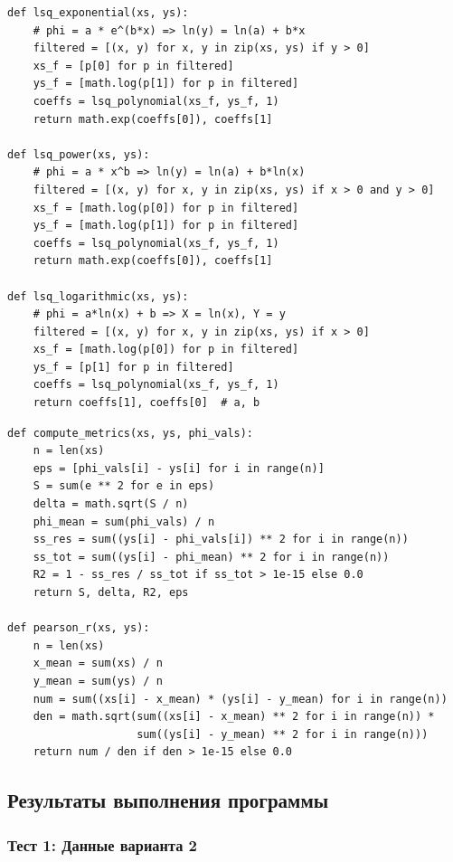 \documentclass[a4paper,12pt]{article}
\begin{document}
\begin{lstlisting}[style=intellij, caption={Линеаризация нелинейных функций}]
def lsq_exponential(xs, ys):
    # phi = a * e^(b*x) => ln(y) = ln(a) + b*x
    filtered = [(x, y) for x, y in zip(xs, ys) if y > 0]
    xs_f = [p[0] for p in filtered]
    ys_f = [math.log(p[1]) for p in filtered]
    coeffs = lsq_polynomial(xs_f, ys_f, 1)
    return math.exp(coeffs[0]), coeffs[1]

def lsq_power(xs, ys):
    # phi = a * x^b => ln(y) = ln(a) + b*ln(x)
    filtered = [(x, y) for x, y in zip(xs, ys) if x > 0 and y > 0]
    xs_f = [math.log(p[0]) for p in filtered]
    ys_f = [math.log(p[1]) for p in filtered]
    coeffs = lsq_polynomial(xs_f, ys_f, 1)
    return math.exp(coeffs[0]), coeffs[1]

def lsq_logarithmic(xs, ys):
    # phi = a*ln(x) + b => X = ln(x), Y = y
    filtered = [(x, y) for x, y in zip(xs, ys) if x > 0]
    xs_f = [math.log(p[0]) for p in filtered]
    ys_f = [p[1] for p in filtered]
    coeffs = lsq_polynomial(xs_f, ys_f, 1)
    return coeffs[1], coeffs[0]  # a, b
\end{lstlisting}

\begin{lstlisting}[style=intellij, caption={Метрики качества аппроксимации}]
def compute_metrics(xs, ys, phi_vals):
    n = len(xs)
    eps = [phi_vals[i] - ys[i] for i in range(n)]
    S = sum(e ** 2 for e in eps)
    delta = math.sqrt(S / n)
    phi_mean = sum(phi_vals) / n
    ss_res = sum((ys[i] - phi_vals[i]) ** 2 for i in range(n))
    ss_tot = sum((ys[i] - phi_mean) ** 2 for i in range(n))
    R2 = 1 - ss_res / ss_tot if ss_tot > 1e-15 else 0.0
    return S, delta, R2, eps

def pearson_r(xs, ys):
    n = len(xs)
    x_mean = sum(xs) / n
    y_mean = sum(ys) / n
    num = sum((xs[i] - x_mean) * (ys[i] - y_mean) for i in range(n))
    den = math.sqrt(sum((xs[i] - x_mean) ** 2 for i in range(n)) *
                    sum((ys[i] - y_mean) ** 2 for i in range(n)))
    return num / den if den > 1e-15 else 0.0
\end{lstlisting}

\subsection{Результаты выполнения программы}

\subsubsection{Тест 1: Данные варианта 2}
\end{document}
